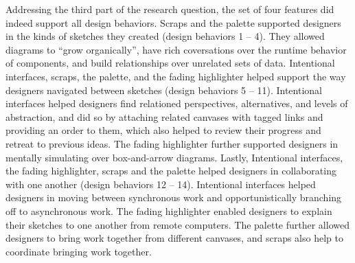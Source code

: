 Addressing the third part of the research question, the set of four features did indeed support all design behaviors. Scraps and the palette supported designers in the kinds of sketches they created (design behaviors 1 -- 4). They allowed diagrams to ``grow organically'', have rich coversations over the runtime behavior of components, and build relationships over unrelated sets of data. Intentional interfaces, scraps, the palette, and the fading highlighter helped support the way designers navigated between sketches (design behaviors 5 -- 11). Intentional interfaces helped designers find relationed perspectives, alternatives, and levels of abstraction, and did so by attaching related canvases with tagged links and providing an order to them, which also helped to review their progress and retreat to previous ideas. The fading highlighter further supported designers in mentally simulating over box-and-arrow diagrams. Lastly, Intentional interfaces, the fading highlighter, scraps and the palette helped designers in collaborating with one another (design behaviors 12 -- 14). Intentional interfaces helped designers in moving between synchronous work and opportunistically branching off to asynchronous work. The fading highlighter enabled designers to explain their sketches to one another from remote computers. The palette further allowed designers to bring work together from different canvases, and scraps also help to coordinate bringing work together.





%
%

